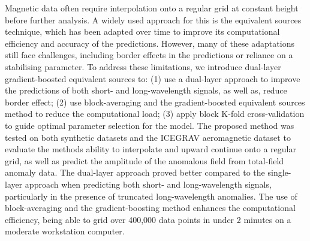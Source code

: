 Magnetic data often require interpolation onto a regular grid at constant height before further analysis. A widely used approach for this is the equivalent sources technique, which has been adapted over time to improve its computational efficiency and accuracy of the predictions. However, many of these adaptations still face challenges, including border effects in the predictions or reliance on a stabilising parameter. To address these limitations, we introduce dual-layer gradient-boosted equivalent sources to: (1) use a dual-layer approach to improve the predictions of both short- and long-wavelength signals, as well as, reduce border effect; (2) use block-averaging and the gradient-boosted equivalent sources method to reduce the computational load; (3) apply block K-fold cross-validation to guide optimal parameter selection for the model. The proposed method was tested on both synthetic datasets and the ICEGRAV aeromagnetic dataset to evaluate the methods ability to interpolate and upward continue onto a regular grid, as well as predict the amplitude of the anomalous field from total-field anomaly data. The dual-layer approach proved better compared to the single-layer approach when predicting both short- and long-wavelength signals, particularly in the presence of truncated long-wavelength anomalies. The use of block-averaging and the gradient-boosting method enhances the computational efficiency, being able to grid over 400,000 data points in under 2 minutes on a moderate workstation computer.